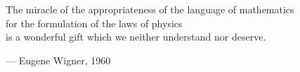 \begin{flushright}
\begin{hangleftquote}{\QENOpen}{\QENClose}
The miracle of the appropriateness of the language of mathematics\\
for the formulation of the laws of physics\\
is a wonderful gift which we neither understand nor deserve.
\end{hangleftquote}
\par\smallskip
\normalfont — Eugene Wigner, 1960
\end{flushright}
